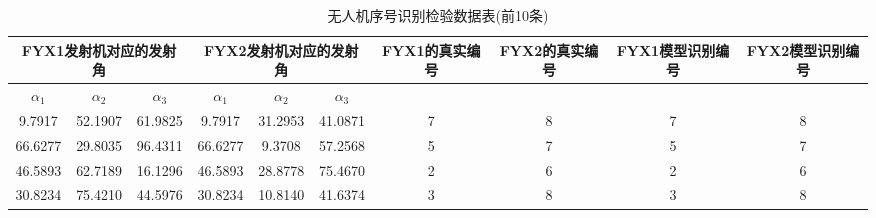 \documentclass[withoutpreface,bwprint]{cumcmthesis} %
\begin{document}
					\begin{table}[htbp!]
						\footnotesize
						\caption{无人机序号识别检验数据表(前10条)}
						\centering
						\tabcolsep=0.1cm
						\begin{tabular}{@{}cccccccccc@{}}
							\toprule
							\multicolumn{3}{c}{\textbf{FYX1发射机对应的发射角}}                                                           & \multicolumn{3}{c}{\textbf{FYX2发射机对应的发射角}}                                                           & \textbf{FYX1的真实编号} & \textbf{FYX2的真实编号} & \textbf{FYX1模型识别编号} & \textbf{FYX2模型识别编号} \\ \midrule
							\multicolumn{1}{c|}{\textbf{$\alpha_{1}$}} & \multicolumn{1}{c|}{\textbf{$\alpha_{2}$}} & \multicolumn{1}{c|}{\textbf{$\alpha_{3}$}} & \multicolumn{1}{c|}{\textbf{$\alpha_{1}$}} & \multicolumn{1}{c|}{\textbf{$\alpha_{2}$}} & \multicolumn{1}{c|}{\textbf{$\alpha_{3}$}} & \multicolumn{4}{c}{\textbf{}}                                                                 \\ \midrule
							9.7917                           & 52.1907                          & 61.9825                          & 9.7917                           & 31.2953                          & 41.0871                          & 7                    & 8                    & 7                      & 8                      \\
							66.6277                          & 29.8035                          & 96.4311                          & 66.6277                          & 9.3708                           & 57.2568                          & 5                    & 7                    & 5                      & 7                      \\
							46.5893                          & 62.7189                          & 16.1296                          & 46.5893                          & 28.8778                          & 75.4670                          & 2                    & 6                    & 2                      & 6                      \\
							30.8234                          & 75.4210                          & 44.5976                          & 30.8234                          & 10.8140                          & 41.6374                          & 3                    & 8                    & 3                      & 8                      \\

\end{tabular}
\end{table}
\end{document}
